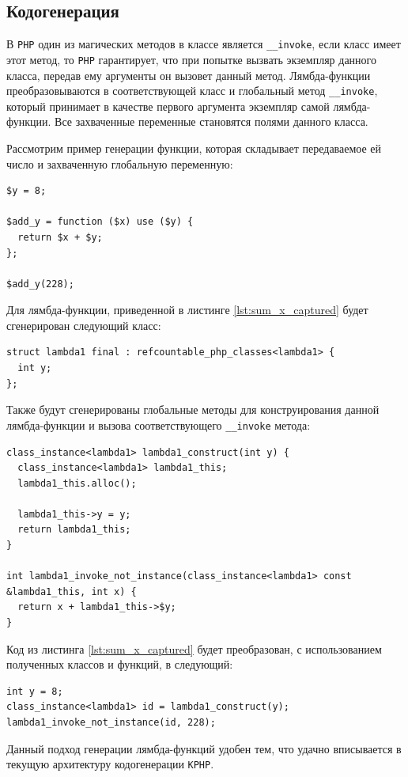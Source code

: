 \subsection{Кодогенерация}
В \verb|PHP| один из магических методов в классе является \verb|__invoke|, если класс имеет этот метод, то \verb|PHP| гарантирует, что при попытке вызвать экземпляр данного класса, передав ему аргументы он вызовет данный метод.
Лямбда-функции преобразовываются в соответствующей класс и глобальный метод \verb|__invoke|, который принимает в качестве первого аргумента экземпляр самой лямбда-функции.
Все захваченные переменные становятся полями данного класса.

Рассмотрим пример генерации функции, которая складывает передаваемое ей число и захваченную глобальную переменную:
\begin{lstlisting}[label={lst:sum_x_captured},caption={Пример функции добавляющей к аргументу захваченное значение}]
$y = 8;

$add_y = function ($x) use ($y) {
  return $x + $y;
};

$add_y(228);
\end{lstlisting}

Для лямбда-функции, приведенной в листинге \ref{lst:sum_x_captured} будет сгенерирован следующий класс:
\begin{lstlisting}
struct lambda1 final : refcountable_php_classes<lambda1> {
  int y;
};
\end{lstlisting}

Также будут сгенерированы глобальные методы для конструирования данной лямбда-функции и вызова соответствующего \verb|__invoke| метода:
\begin{lstlisting}
class_instance<lambda1> lambda1_construct(int y) {
  class_instance<lambda1> lambda1_this;
  lambda1_this.alloc();

  lambda1_this->y = y;
  return lambda1_this;
}

int lambda1_invoke_not_instance(class_instance<lambda1> const &lambda1_this, int x) {
  return x + lambda1_this->$y;
}
\end{lstlisting}

Код из листинга \ref{lst:sum_x_captured} будет преобразован, с использованием полученных классов и функций, в следующий:
\begin{lstlisting}
int y = 8;
class_instance<lambda1> id = lambda1_construct(y);
lambda1_invoke_not_instance(id, 228);
\end{lstlisting}

Данный подход генерации лямбда-функций удобен тем, что удачно вписывается в текущую архитектуру кодогенерации \verb|KPHP|.

